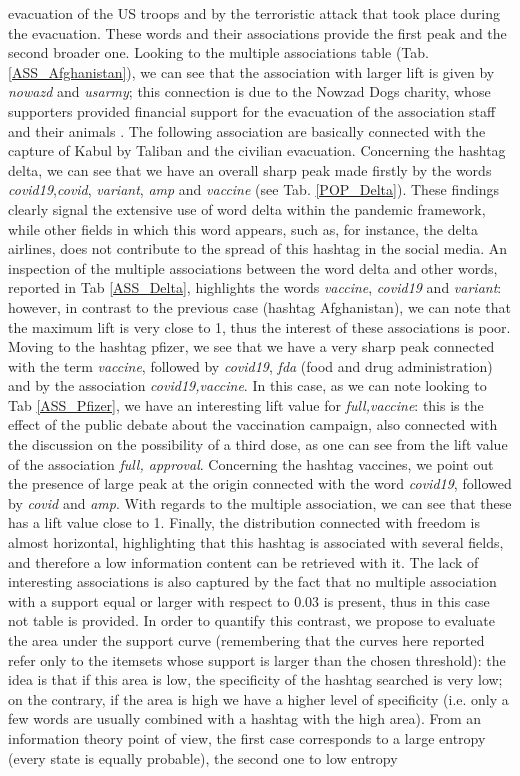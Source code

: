 \documentclass[12pt,%
               a4paper,%
               oneside,openany,%
               titlepage,%
               headinclude,footinclude,%
               BCOR5mm,%
               cleardoublepage=empty,%
               tablecaptionabove,%
               floatperchapter,
               ]{scrreprt}                 %
\begin{document}
evacuation of the US troops and by the terroristic attack that took place during the evacuation. These words and their associations provide the first peak and the second broader one. Looking to the multiple associations table (Tab. \ref{ASS_Afghanistan}), we can see that the association with larger lift is given by \textit{nowazd} and \textit{usarmy}; this connection is due to the Nowzad Dogs charity, whose supporters provided financial support for the evacuation of the association staff and their animals \cite{Nowzad}. The following association are basically connected with the capture of Kabul by Taliban and the civilian evacuation. Concerning the hashtag delta, we can see that we have an overall sharp peak made firstly by the words \textit{covid19},\textit{covid}, \textit{variant}, \textit{amp} and \textit{vaccine} (see Tab. \ref{POP_Delta}). These findings clearly signal the extensive use of word delta within the pandemic framework, while other fields in which this word appears, such as, for instance, the delta airlines, does not contribute to the spread of this hashtag in the social media. An inspection of the multiple associations between the word delta and other words, reported in Tab \ref{ASS_Delta}, highlights the words \textit{vaccine}, \textit{covid19} and \textit{variant}: however, in contrast to the previous case (hashtag Afghanistan), we can note that the maximum lift is very close to 1, thus the interest of these associations is poor. Moving to the hashtag pfizer, we see that we have a very sharp peak connected with the term \textit{vaccine}, followed by \textit{covid19}, \textit{fda} (food and drug administration) and by the association \textit{covid19,vaccine}. In this case, as we can note looking to Tab \ref{ASS_Pfizer}, we have an interesting lift value for \textit{full,vaccine}: this is the effect of the public debate about the vaccination campaign, also connected with the discussion on the possibility of a third dose, as one can see from the lift value of the association \textit{full, approval}. Concerning the hashtag vaccines, we point out the presence of large peak at the origin connected with the word \textit{covid19}, followed by \textit{covid} and \textit{amp}. With regards to the multiple association, we can see that these has a lift value close to 1. Finally, the distribution connected with freedom is almost horizontal, highlighting that this hashtag is associated with several fields, and therefore a low information content can be retrieved with it. The lack of interesting associations is also captured by the fact that no multiple association with a support equal or larger with respect to 0.03 is present, thus in this case not table is provided. In order to quantify this contrast, we propose to evaluate the area under the support curve (remembering that the curves here reported refer only to the itemsets whose support is larger than the chosen threshold): the idea is that if this area is low, the specificity of the hashtag searched is very low; on the contrary, if the area is high we have a higher level of specificity (i.e. only a few words are usually combined with a hashtag with the high area). From an information theory point of view, the first case corresponds to a large entropy (every state is equally probable), the second one to low entropy 
\end{document}

